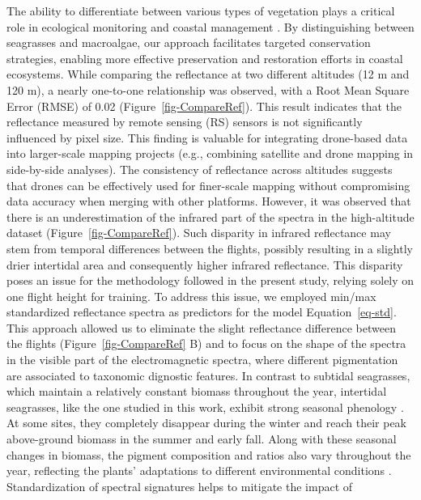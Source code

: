 \documentclass[
  number]{elsarticle}
\begin{document}
The ability to differentiate between various types of vegetation plays a
critical role in ecological monitoring and coastal management
\citep{WFD2000}. By distinguishing between seagrasses and macroalgae,
our approach facilitates targeted conservation strategies, enabling more
effective preservation and restoration efforts in coastal ecosystems.
While comparing the reflectance at two different altitudes (12 m and 120
m), a nearly one-to-one relationship was observed, with a Root Mean
Square Error (RMSE) of 0.02 (Figure~\ref{fig-CompareRef}). This result
indicates that the reflectance measured by remote sensing (RS) sensors
is not significantly influenced by pixel size. This finding is valuable
for integrating drone-based data into larger-scale mapping projects
(e.g., combining satellite and drone mapping in side-by-side analyses).
The consistency of reflectance across altitudes suggests that drones can
be effectively used for finer-scale mapping without compromising data
accuracy when merging with other platforms. However, it was observed
that there is an underestimation of the infrared part of the spectra in
the high-altitude dataset (Figure~\ref{fig-CompareRef}). Such disparity
in infrared reflectance may stem from temporal differences between the
flights, possibly resulting in a slightly drier intertidal area and
consequently higher infrared reflectance. This disparity poses an issue
for the methodology followed in the present study, relying solely on one
flight height for training. To address this issue, we employed min/max
standardized reflectance spectra as predictors for the model
Equation~\ref{eq-std}. This approach allowed us to eliminate the slight
reflectance difference between the flights (Figure~\ref{fig-CompareRef}
B) and to focus on the shape of the spectra in the visible part of the
electromagnetic spectra, where different pigmentation are associated to
taxonomic dignostic features. In contrast to subtidal seagrasses, which
maintain a relatively constant biomass throughout the year, intertidal
seagrasses, like the one studied in this work, exhibit strong seasonal
phenology \citep{davies2024sentinel}. At some sites, they completely
disappear during the winter and reach their peak above-ground biomass in
the summer and early fall. Along with these seasonal changes in biomass,
the pigment composition and ratios also vary throughout the year,
reflecting the plants' adaptations to different environmental conditions
\citetext{\citealp[ ]{bargain2013seasonal}; \citealp{legare2022remote}}.
Standardization of spectral signatures helps to mitigate the impact of
\end{document}
